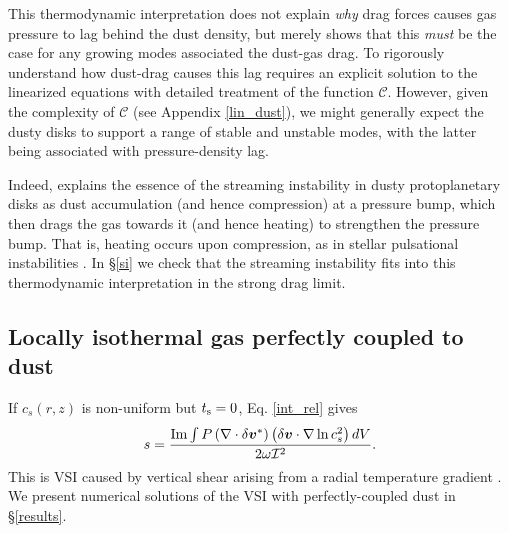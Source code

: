 This thermodynamic interpretation does not explain 
\emph{why} drag forces causes gas pressure to lag behind the dust
density, but merely shows 
that this \emph{must} be the case for any growing modes associated the
dust-gas drag. To rigorously understand how dust-drag causes this 
lag requires an explicit solution to the linearized equations with 
detailed treatment of the function $\mathcal{C}$. However, given the complexity of
$\mathcal{C}$ (see Appendix \ref{lin_dust}), we might generally expect
the dusty disks to  support a range of stable and unstable modes, with the
latter being associated with pressure-density lag. 

Indeed, \cite{jacquet11} explains the essence of the streaming 
instability in dusty protoplanetary disks as dust accumulation
(and hence compression) at a pressure bump, which then drags the 
gas towards it (and hence heating) to strengthen the pressure
bump. That is, heating occurs upon compression, as in stellar  
pulsational instabilities \citep{cox67}. In \S\ref{si} we check that the
streaming instability fits into this thermodynamic interpretation in
the strong drag limit.  



\subsection{Locally isothermal gas perfectly coupled to dust}\label{dusty_vsi_int}
If $c_s(r,z)$ is non-uniform but $t_\mathrm{s}=0$, Eq. \ref{int_rel} 
gives  
\begin{align}
  s = \frac{\operatorname{Im}\int P
    \left(\nabla\cdot\delta\bm{v}^*\right)\left(\delta\bm{v}\cdot\nabla\ln{c_s^2}\right)dV}{2\omega\mathcal{I}^2}. \label{vsi_check} 
\end{align} 
This is VSI caused by vertical shear arising from a radial
temperature gradient \citep{nelson13,barker15,lin15}. We present 
numerical solutions of the VSI with perfectly-coupled dust in \S\ref{results}. 
